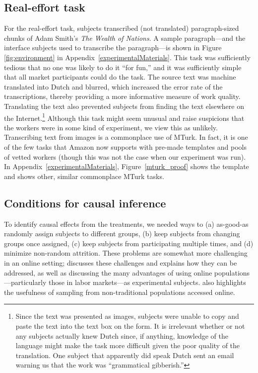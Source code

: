 \documentclass[11pt]{article}
\begin{document}
\subsection{Real-effort task} 
For the real-effort task, subjects transcribed (not translated) paragraph-sized chunks of Adam Smith's \emph{The Wealth of Nations}. 
A sample paragraph---and the interface subjects used to transcribe the paragraph---is shown in Figure \ref{fig:environment} in Appendix~\ref{experimentalMaterials}.  
This task was sufficiently tedious that no one was likely to do it ``for fun,'' and it was sufficiently simple that all market participants could do the task. 
The source text was machine translated into Dutch and blurred, which increased the error rate of the transcriptions, thereby providing a more informative measure of work quality. 
Translating the text also prevented subjects from finding the text elsewhere on the Internet.\footnote{
  Since the text was presented as images, subjects were unable to copy and paste the text into the text box on the form.
  It is irrelevant whether or not any subjects actually knew Dutch since, if anything, knowledge of the language might make the task more difficult given the poor quality of the translation.
  One subject that apparently did speak Dutch sent an email warning us that the work was ``grammatical gibberish.''
}
Although this task might seem unusual and raise suspicions that the workers were in some kind of experiment, we view this as unlikely. 
Transcribing text from images is a commonplace use of MTurk. 
In fact, it is one of the few tasks that Amazon now supports with pre-made templates and pools of vetted workers (though this was not the case when our experiment was run). 
In Appendix~\ref{experimentalMaterials}, Figure~\ref{mturk_proof} shows the template and shows other, similar commonplace MTurk tasks.  

\subsection{Conditions for causal inference}
To identify causal effects from the treatments, we needed ways to (a) as-good-as randomly assign subjects to different groups, (b) keep subjects from changing groups once assigned, (c) keep subjects from participating multiple times, and (d) minimize non-random attrition.
These problems are somewhat more challenging in an online setting; 
\cite{horton2011online} discusses these challenges and explains how they can be addressed, as well as discussing the many advantages of using online populations---particularly those in labor markets---as experimental subjects. 
\cite{steelman2014data} also highlights the usefulness of sampling from non-traditional populations accessed online.   
\end{document}
